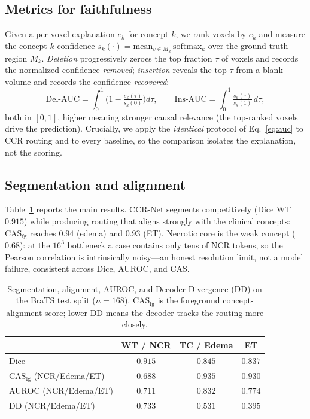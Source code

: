 \documentclass[runningheads]{llncs}
\newcommand{\casfg}{\mathrm{CAS}_{\mathrm{fg}}}
\begin{document}
\subsection{Metrics for faithfulness}\label{sec:metricdef}
Given a per-voxel explanation $e_k$ for concept $k$, we rank voxels by $e_k$ and measure
the concept-$k$ confidence $s_k(\cdot)=\mathrm{mean}_{v\in M_k}\,\mathrm{softmax}_k$ over
the ground-truth region $M_k$. \emph{Deletion} progressively zeroes the top fraction
$\tau$ of voxels and records the normalized confidence \emph{removed}; \emph{insertion}
reveals the top $\tau$ from a blank volume and records the confidence \emph{recovered}:
\begin{equation}
\text{Del-AUC}=\!\int_0^1\!\Big(1-\tfrac{s_k(\tau)}{s_k(0)}\Big)d\tau,
\qquad
\text{Ins-AUC}=\!\int_0^1\!\tfrac{s_k(\tau)}{s_k(1)}\,d\tau,
\label{eq:auc}
\end{equation}
both in $[0,1]$, higher meaning stronger causal relevance (the top-ranked voxels drive the
prediction). Crucially, we apply the \emph{identical}
protocol of Eq.~\ref{eq:auc} to CCR routing and to every baseline, so the comparison
isolates the explanation, not the scoring.

\subsection{Segmentation and alignment}
Table~\ref{tab:main} reports the main results. CCR-Net segments competitively (Dice WT
$0.915$) while producing routing that aligns strongly with the clinical concepts:
$\casfg$ reaches $0.94$ (edema) and $0.93$ (ET). Necrotic core is the weak concept
($0.68$): at the $16^3$ bottleneck a case contains only tens of NCR tokens, so the Pearson
correlation is intrinsically noisy---an honest resolution limit, not a model failure,
consistent across Dice, AUROC, and CAS.

\begin{table}[t]
\centering
\caption{Segmentation, alignment, AUROC, and Decoder Divergence (DD) on the BraTS test
split ($n{=}168$). $\casfg$ is the foreground concept-alignment score; lower DD means the
decoder tracks the routing more closely.}
\label{tab:main}
\begin{tabular}{lccc}
\toprule
& WT / NCR & TC / Edema & ET \\
\midrule
Dice                       & $0.915$ & $0.845$ & $0.837$ \\
$\casfg$ (NCR/Edema/ET)    & $0.688$ & $0.935$ & $0.930$ \\
AUROC (NCR/Edema/ET)       & $0.711$ & $0.832$ & $0.774$ \\
DD (NCR/Edema/ET)          & $0.733$ & $0.531$ & $0.395$ \\
\bottomrule
\end{tabular}
\end{table}
\end{document}
